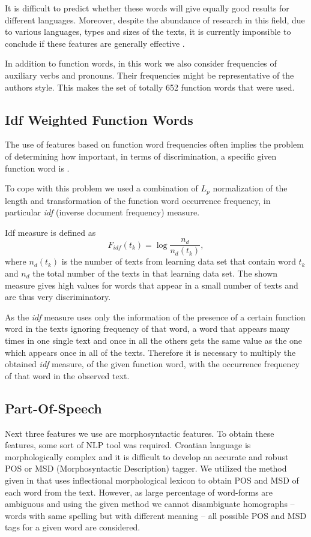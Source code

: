 \documentclass{llncs}
\begin{document}
It is difficult to predict whether these words will give equally good results for
different languages. Moreover, despite the abundance of research in this field,
due to various languages, types and sizes of the texts, it is currently
impossible to conclude if these features are generally effective
\cite{zhao2005effective}.

In addition to function words, in this work we also consider frequencies of
auxiliary verbs and pronouns. Their frequencies might be
representative of the authors style. This makes the set of totally
652 function words that were used.

\subsection{Idf Weighted Function Words}
\label{sec:funkcijske-rijeci-idf}

The use of features based on function word frequencies often implies the
problem of determining how important, in terms of discrimination, a
specific given function word is \cite{diederich2003authorship}.

To cope with this problem we used a combination of $L_p$ normalization of the
length and transformation of the function word occurrence frequency, in
particular \emph{idf} (inverse document frequency) measure.

Idf measure is defined as \cite{diederich2003authorship}
\begin{equation}
F_{idf}(t_k) = \log \frac{n_d}{n_d(t_k)},
\label{equ:idf}
\end{equation}
where $n_d(t_k)$ is the number of texts from learning data set that contain word
$t_k$ and $n_d$ the total number of the texts in that learning data set. The
shown measure gives high values for words that appear in a small number of
texts and are thus very discriminatory.

As the \emph{idf} measure uses only the information of the presence of a
certain function word in the texts ignoring frequency of that word, a word that appears
many times in one single text and once in all the others gets the same value as
the one which appears once in all of the texts. Therefore it is necessary to
multiply the obtained \emph{idf} measure, of the given function word, with the
occurrence frequency of that word in the observed text.

\subsection{Part-Of-Speech}
\label{sec:rijeci-grupe}
Next three features we use are morphosyntactic features. To obtain these
features, some sort of NLP tool was required. Croatian language is
morphologically complex and it is difficult to develop an accurate and robust POS
or MSD (Morphosyntactic Description) tagger. We utilized the method given in
\cite{snajder08automatic} that uses inflectional morphological lexicon to obtain
POS and MSD of each word from the text. However, as large percentage of
word-forms are ambiguous and using the given method we cannot disambiguate
homographs -- words with same spelling but with different meaning -- all possible
POS and MSD tags for a given word are considered.
\end{document}
